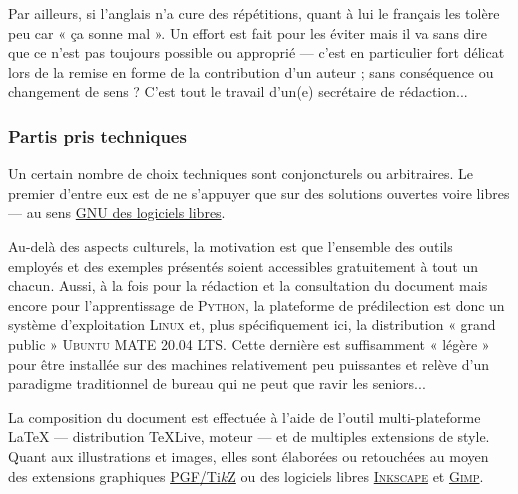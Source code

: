 
Par ailleurs, si l'anglais n'a cure des répétitions, quant à lui le français les tolère peu car « ça sonne mal ». Un effort est fait pour les éviter mais il va sans dire que ce n'est pas toujours possible ou approprié --- c'est en particulier fort délicat lors de la remise en forme de la contribution d'un auteur ; sans conséquence ou changement de sens ? C'est tout le travail d'un(e) secrétaire de rédaction...

\subsubsection*{Partis pris techniques}

Un certain nombre de choix techniques sont conjoncturels ou arbitraires. Le premier d'entre eux est de ne s'appuyer que sur des solutions ouvertes voire libres --- au sens \href{https://www.gnu.org/home.fr.html}{GNU des logiciels libres}. 

Au-delà des aspects culturels, la motivation est que l'ensemble des outils employés et des exemples présentés soient accessibles gratuitement à tout un chacun. Aussi, à la fois pour la rédaction et la consultation du document mais encore pour l'apprentissage de \textsc{Python}, la plateforme de prédilection est donc un système d'exploitation \textsc{Linux} et, plus spécifiquement ici, la distribution « grand public » \textsc{Ubuntu MATE} 20.04 LTS. Cette dernière est suffisamment « légère » pour être installée sur des machines relativement peu puissantes et relève d'un paradigme traditionnel de bureau qui ne peut que ravir les seniors...

La composition du document est effectuée à l'aide de l'outil multi-plateforme \LaTeX{} --- distribution \TeX{}Live{}, moteur \LuaLaTeX{} --- et de multiples extensions de style. Quant aux illustrations et images, elles sont élaborées ou retouchées au moyen des extensions graphiques \href{https://ctan.org/pkg/pgf}{\textsc{PGF}/Ti\textit{k}Z} ou des logiciels libres \href{https://inkscape.org/fr/}{\textsc{Inkscape}} et \href{https://www.gimp.org/fr/}{\textsc{Gimp}}.

